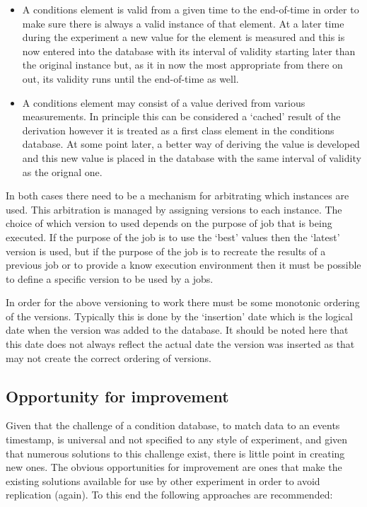 \begin{itemize}
\item A conditions element is valid from a given time to the end-of-time in order to make sure there is always a valid instance of that element. At a later time during the experiment a new value for the element is measured and this is now entered into the database with its interval of validity starting later than the original instance but, as it in now the most appropriate from there on out, its validity runs until the end-of-time as well.

\item A conditions element may consist of a value derived from various measurements. In principle this can be considered a `cached' result of the derivation however it is treated as a first class element in the conditions database. At some point later, a better way of deriving the value is developed and this new value is placed in the database with the same interval of validity as the orignal one.
\end{itemize}

In both cases there need to be a mechanism for arbitrating which instances are used. This arbitration is managed by assigning versions to each instance. The choice of which version to used depends on the purpose of job that is being executed. If the purpose of the job is to use the `best' values then the `latest' version is used, but if the purpose of the job is to recreate the results of a previous job or to provide a know execution environment then it must be possible to define a specific version to be used by a jobs.

In order for the above versioning to work there must be some monotonic ordering of the versions. Typically this is done by the `insertion' date which is the logical date when the version was added to the database. It should be noted here that this date does not always reflect the actual date the version was inserted as that may not create the correct ordering of versions.


\subsection{Opportunity for improvement}

Given that the challenge of a condition database, to match data to an events timestamp, is universal and not specified to any style of experiment, and given that numerous solutions to this challenge exist, there is little point in creating new ones. The obvious opportunities for improvement are ones that make the existing solutions available for use by other experiment in order to avoid replication (again). To this end the following approaches are recommended:

